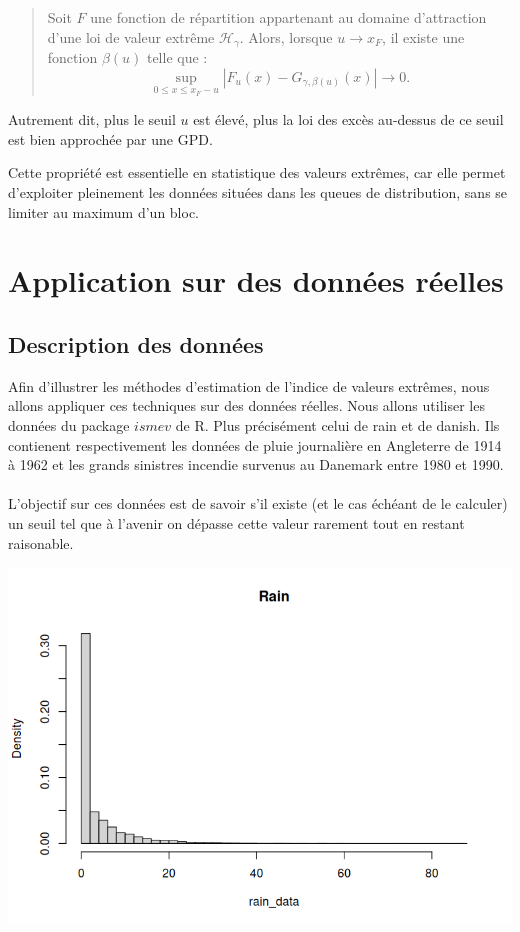 \documentclass{article}
\theoremstyle{plain}
\theoremstyle{definition}
\theoremstyle{plain}
\begin{document}
\begin{quote}
Soit \(F\) une fonction de répartition appartenant au domaine d’attraction d’une loi de valeur extrême \(\mathcal{H}_\gamma\). Alors, lorsque \(u \to x_F\), il existe une fonction \(\beta(u)\) telle que :
\[
\sup_{0 \leq x \leq x_F - u} \left| F_u(x) - G_{\gamma, \beta(u)}(x) \right| \to 0.
\]
\end{quote}

Autrement dit, plus le seuil \(u\) est élevé, plus la loi des excès au-dessus de ce seuil est bien approchée par une GPD.

\medskip
Cette propriété est essentielle en statistique des valeurs extrêmes, car elle permet d’exploiter pleinement les données situées dans les queues de distribution, sans se limiter au maximum d’un bloc.

\newpage
\section{Application sur des données réelles}
\subsection{Description des données}

Afin d'illustrer les méthodes d'estimation de l'indice de valeurs extrêmes, nous allons appliquer ces techniques sur des données réelles.
Nous allons utiliser les données du package $ismev$ de R. Plus précisément celui de rain et de danish. Ils contienent respectivement les données de pluie journalière en Angleterre de 1914 à 1962 et 
les grands sinistres incendie survenus au Danemark entre 1980 et 1990.
\\
\\
L'objectif sur ces données est de savoir s'il existe (et le cas échéant de le calculer) un seuil tel que à l'avenir on dépasse cette valeur rarement tout en restant raisonable.

\begin{center}
	\includegraphics[scale=0.70]{./images/rainhisto.png} 
\end{center}
\end{document}

